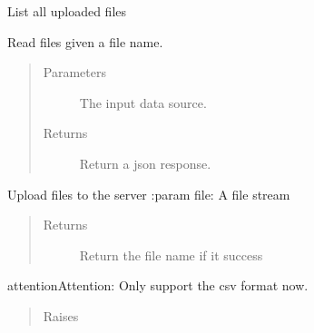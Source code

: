 \documentclass[letterpaper,10pt,english]{sphinxmanual}
\begin{document}
\begin{fulllineitems}
\label{\detokenize{cloudmesh.analytics:cloudmesh.analytics.file.list}}
List all uploaded files

\end{fulllineitems}


\begin{fulllineitems}
\label{\detokenize{cloudmesh.analytics:cloudmesh.analytics.file.read}}
Read files given a file name.
\begin{quote}\begin{description}
\item[{Parameters}] \leavevmode
{} \textendash{} The input data source.

\item[{Returns}] \leavevmode
Return a json response.

\end{description}\end{quote}

\end{fulllineitems}


\begin{fulllineitems}
\label{\detokenize{cloudmesh.analytics:cloudmesh.analytics.file.upload}}
Upload files to the server
:param file: A file stream
\begin{quote}\begin{description}
\item[{Returns}] \leavevmode
Return the file name if it success

\end{description}\end{quote}

\begin{sphinxadmonition}{attention}{Attention:}
Only support the csv format now.
\end{sphinxadmonition}
\begin{quote}\begin{description}
\item[{Raises}] \leavevmode
{} \textendash{} 

\end{description}\end{quote}

\end{fulllineitems}
\end{document}
